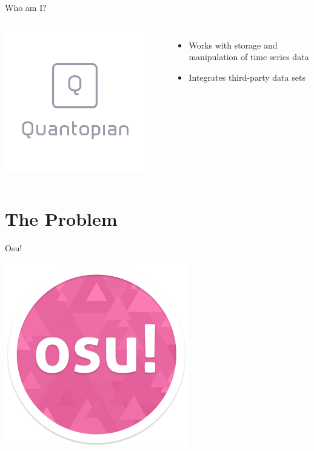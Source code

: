 \documentclass[table]{beamer}
\begin{document}
\begin{frame}{Who am I?}
  \begin{columns}
    \begin{center}
      \includegraphics[width=0.90\textwidth]{images/quantopian.png}
    \end{center}

    \begin{itemize}
    \item Works with storage and manipulation of time series data
    \item Integrates third-party data sets
    \end{itemize}
  \end{columns}
\end{frame}

\section{The Problem}

\begin{frame}{Osu!}
  \begin{center}
    \includegraphics[width=0.60\textwidth]{images/osu-logo.png}
  \end{center}
\end{frame}
\end{document}
